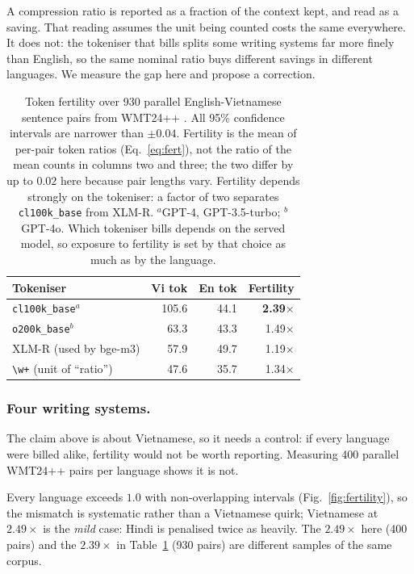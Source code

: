\documentclass{llncs}
\begin{document}
A compression ratio is reported as a fraction of the context kept, and read as a
saving. That reading assumes the unit being counted costs the same everywhere.
It does not: the tokeniser that bills splits some writing systems far more
finely than English, so the same nominal ratio buys different savings in
different languages. We measure the gap here and propose a correction.

\begin{table}[htbp]
\centering
\caption{Token fertility over 930 parallel English-Vietnamese sentence pairs from
WMT24++ \cite{deutsch2025wmt24pp}. All 95\% confidence intervals are narrower
than $\pm0.04$. Fertility is the mean of per-pair token ratios (Eq.~\ref{eq:fert}),
not the ratio of the mean counts in columns two and three; the two differ by up to
$0.02$ here because pair lengths vary. Fertility depends strongly on the tokeniser:
a factor of two separates \texttt{cl100k\_base} from XLM-R. $^a$GPT-4, GPT-3.5-turbo;
$^b$GPT-4o. Which tokeniser bills depends on the served model, so exposure to
fertility is set by that choice as much as by the language.}
\label{tab:fertility}
\small
\begin{tabular}{lrrr}
\toprule
Tokeniser & Vi tok & En tok & Fertility \\
\midrule
\texttt{cl100k\_base}$^a$ & 105.6 & 44.1 & \textbf{2.39}$\times$ \\
\texttt{o200k\_base}$^b$ & 63.3 & 43.3 & 1.49$\times$ \\
XLM-R (used by bge-m3) & 57.9 & 49.7 & 1.19$\times$ \\
\texttt{\textbackslash w+} (unit of ``ratio'') & 47.6 & 35.7 & 1.34$\times$ \\
\bottomrule
\end{tabular}
\end{table}

\subsubsection{Four writing systems.}
\label{sec:multiling}
The claim above is about Vietnamese, so it needs a control: if every language were
billed alike, fertility would not be worth reporting. Measuring 400 parallel
WMT24++ pairs per language shows it is not.

Every language exceeds $1.0$ with non-overlapping intervals
(Fig.~\ref{fig:fertility}), so the mismatch is systematic rather than a Vietnamese quirk; Vietnamese at $2.49\times$ is the \emph{mild} case: Hindi is penalised twice as heavily. The $2.49\times$ here (400 pairs) and the $2.39\times$ in Table~\ref{tab:fertility} (930 pairs) are different samples of the same corpus.
\end{document}
